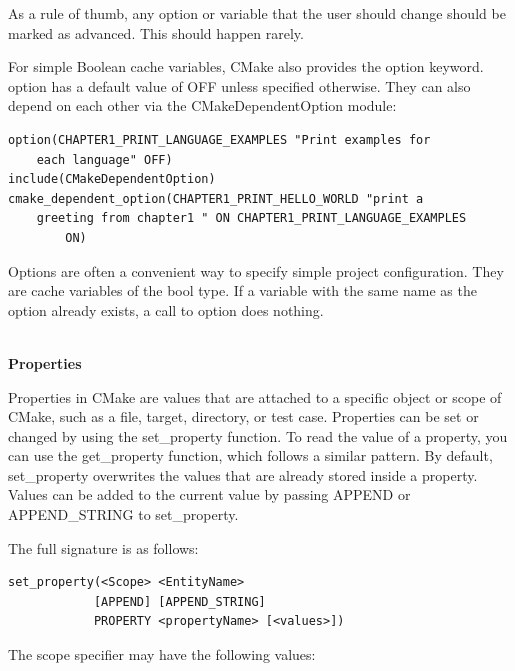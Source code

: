As a rule of thumb, any option or variable that the user should change should be marked as advanced. This should happen rarely.

For simple Boolean cache variables, CMake also provides the option keyword. option
has a default value of OFF unless specified otherwise. They can also depend on each other via the CMakeDependentOption module:

\begin{lstlisting}[style=styleCMake]
option(CHAPTER1_PRINT_LANGUAGE_EXAMPLES "Print examples for 
	each language" OFF)
include(CMakeDependentOption)
cmake_dependent_option(CHAPTER1_PRINT_HELLO_WORLD "print a
	greeting from chapter1 " ON CHAPTER1_PRINT_LANGUAGE_EXAMPLES
		ON)
\end{lstlisting}

Options are often a convenient way to specify simple project configuration. They are cache variables of the bool type. If a variable with the same name as the option already exists, a call to option does nothing.

\hspace*{\fill} \\ %
\noindent
\textbf{Properties}

Properties in CMake are values that are attached to a specific object or scope of CMake, such as a file, target, directory, or test case. Properties can be set or changed by using the set\_property function. To read the value of a property, you can use the get\_property function, which follows a similar pattern. By default, set\_property overwrites the values that are already stored inside a property. Values can be added to the current value by passing APPEND or APPEND\_STRING to set\_property.

The full signature is as follows:

\begin{lstlisting}[style=styleCMake]
set_property(<Scope> <EntityName>
			[APPEND] [APPEND_STRING]
			PROPERTY <propertyName> [<values>])
\end{lstlisting}

The scope specifier may have the following values:

